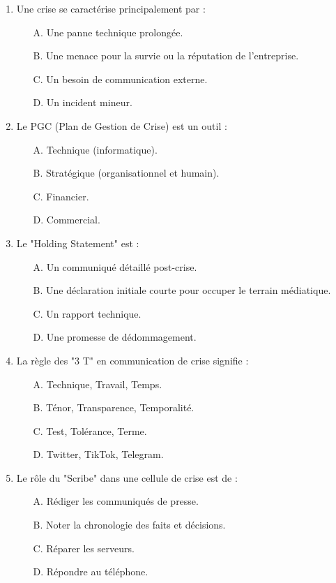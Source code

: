 \begin{enumerate}
    \item Une crise se caractérise principalement par :
    \begin{itemize}
        \item[A.] Une panne technique prolongée.
        \item[B.] Une menace pour la survie ou la réputation de l'entreprise.
        \item[C.] Un besoin de communication externe.
        \item[D.] Un incident mineur.
    \end{itemize}

    \item Le PGC (Plan de Gestion de Crise) est un outil :
    \begin{itemize}
        \item[A.] Technique (informatique).
        \item[B.] Stratégique (organisationnel et humain).
        \item[C.] Financier.
        \item[D.] Commercial.
    \end{itemize}

    \item Le "Holding Statement" est :
    \begin{itemize}
        \item[A.] Un communiqué détaillé post-crise.
        \item[B.] Une déclaration initiale courte pour occuper le terrain médiatique.
        \item[C.] Un rapport technique.
        \item[D.] Une promesse de dédommagement.
    \end{itemize}

    \item La règle des "3 T" en communication de crise signifie :
    \begin{itemize}
        \item[A.] Technique, Travail, Temps.
        \item[B.] Ténor, Transparence, Temporalité.
        \item[C.] Test, Tolérance, Terme.
        \item[D.] Twitter, TikTok, Telegram.
    \end{itemize}

    \item Le rôle du "Scribe" dans une cellule de crise est de :
    \begin{itemize}
        \item[A.] Rédiger les communiqués de presse.
        \item[B.] Noter la chronologie des faits et décisions.
        \item[C.] Réparer les serveurs.
        \item[D.] Répondre au téléphone.
    \end{itemize}


\end{enumerate}
